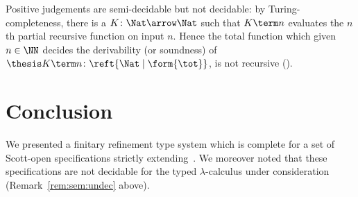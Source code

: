 

\begin{remark}[Undecidability]
\label{rem:sem:undec}
Positive judgements are semi-decidable but not decidable:
by Turing-completeness,
there is a $K \colon \Nat \arrow \Nat$
such that $K \term n$ evaluates the $n$th partial recursive function on input $n$.
Hence the total function which given $n \in \NN$
decides the derivability (or soundness)
of $\thesis K \term n \colon \reft{\Nat \mid \form{\tot}}$,
is not recursive
(\cite[Theorem II.2.3]{odifreddi99book}).
\lipicsEnd
\end{remark}


\section{Conclusion}
\label{sec:conc}

We presented a finitary refinement type system which is
complete for a set of Scott-open specifications 
strictly extending~\cite{abramsky87lics,abramsky91apal}.
We moreover noted that these specifications are not decidable 
for the typed $\lambda$-calculus under consideration (Remark~\ref{rem:sem:undec} above).

